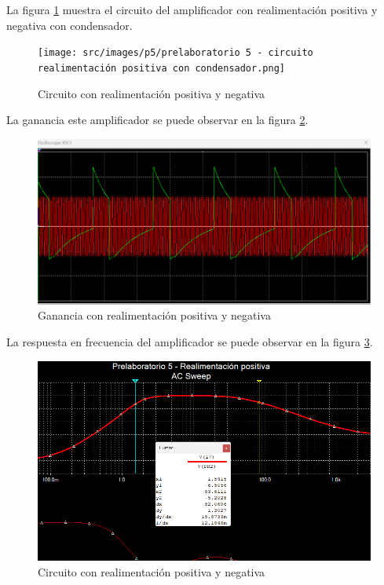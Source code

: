 
La figura \ref{fig:circuito-amplificador-realimentacion-positiva-y-negativa} muestra el circuito del amplificador con realimentación positiva y negativa con condensador.

\begin{figure}[ht]
    \centering
    \texttt{[image: src/images/p5/prelaboratorio 5 - circuito realimentación positiva con condensador.png]}
    \caption{Circuito con realimentación positiva y negativa} 
    \label{fig:circuito-amplificador-realimentacion-positiva-y-negativa}
\end{figure}
\FloatBarrier

La ganancia este amplificador se puede observar en la figura \ref{fig:ganancia-amplificador-realimentacion-positiva-y-negativa}.
\begin{figure}[ht]
    \centering
    \includegraphics[width=\textwidth]{src/images/p5/Prelaboratorio 5 - Ganancia realimentacion positiva con condensador.png}
    \caption{Ganancia con realimentación positiva y negativa} 
    \label{fig:ganancia-amplificador-realimentacion-positiva-y-negativa}
\end{figure}
\FloatBarrier

La respuesta en frecuencia del amplificador se puede observar en la figura \ref{fig:respuesta-amplificador-realimentacion-positiva-y-negativa}.

\begin{figure}[ht]
    \centering
    \includegraphics[width=\textwidth]{src/images/p5/Prelaboratorio 5 - Respuesta en frecuencia - realimentacion positiva con condensador.png}
    \caption{Circuito con realimentación positiva y negativa} 
    \label{fig:respuesta-amplificador-realimentacion-positiva-y-negativa}
\end{figure}
